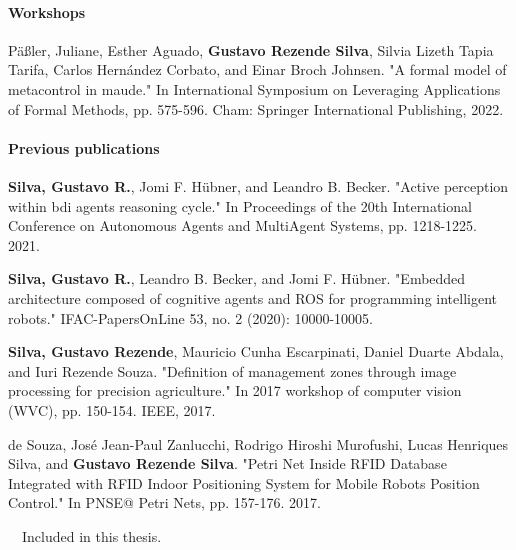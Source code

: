 \paragraph{Workshops}

\begin{etaremune}{\small
  \item[1.] Päßler, Juliane, Esther Aguado, \textbf{Gustavo Rezende Silva}, Silvia Lizeth Tapia Tarifa, Carlos Hernández Corbato, and Einar Broch Johnsen. "A formal model of metacontrol in maude." In International Symposium on Leveraging Applications of Formal Methods, pp. 575-596. Cham: Springer International Publishing, 2022.
}
\end{etaremune}

\paragraph{Previous publications}
\begin{etaremune}{\small
  \item[1.] \textbf{Silva, Gustavo R.}, Jomi F. Hübner, and Leandro B. Becker. "Active perception within bdi agents reasoning cycle." In Proceedings of the 20th International Conference on Autonomous Agents and MultiAgent Systems, pp. 1218-1225. 2021.
  \item[2.] \textbf{Silva, Gustavo R.}, Leandro B. Becker, and Jomi F. Hübner. "Embedded architecture composed of cognitive agents and ROS for programming intelligent robots." IFAC-PapersOnLine 53, no. 2 (2020): 10000-10005.
  \item[3.] \textbf{Silva, Gustavo Rezende}, Mauricio Cunha Escarpinati, Daniel Duarte Abdala, and Iuri Rezende Souza. "Definition of management zones through image processing for precision agriculture." In 2017 workshop of computer vision (WVC), pp. 150-154. IEEE, 2017.
  \item[4.] de Souza, José Jean-Paul Zanlucchi, Rodrigo Hiroshi Murofushi, Lucas Henriques Silva, and \textbf{Gustavo Rezende Silva}. "Petri Net Inside RFID Database Integrated with RFID Indoor Positioning System for Mobile Robots Position Control." In PNSE@ Petri Nets, pp. 157-176. 2017.
}
\end{etaremune}

\vspace{0.5cm}
\noindent
{\faFileLines[regular]}~~Included in this thesis.\\
